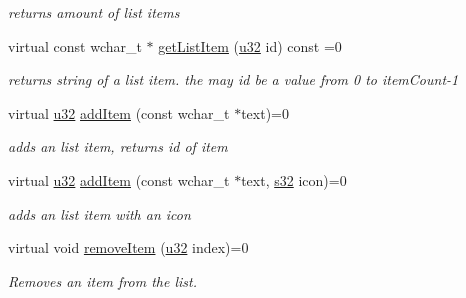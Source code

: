 \begin{DoxyCompactItemize}
\begin{DoxyCompactList}\small\item\em returns amount of list items \end{DoxyCompactList}\item 
\mbox{\label{classirr_1_1gui_1_1IGUIListBox_af68ea08c93b0959ea464146bc1f4d82f}} 
virtual const wchar\+\_\+t $\ast$ \hyperlink{classirr_1_1gui_1_1IGUIListBox_af68ea08c93b0959ea464146bc1f4d82f}{get\+List\+Item} (\hyperlink{namespaceirr_a0416a53257075833e7002efd0a18e804}{u32} id) const =0
\begin{DoxyCompactList}\small\item\em returns string of a list item. the may id be a value from 0 to item\+Count-\/1 \end{DoxyCompactList}\item 
\mbox{\label{classirr_1_1gui_1_1IGUIListBox_a298dbba8da28248b563a906c520dc3be}} 
virtual \hyperlink{namespaceirr_a0416a53257075833e7002efd0a18e804}{u32} \hyperlink{classirr_1_1gui_1_1IGUIListBox_a298dbba8da28248b563a906c520dc3be}{add\+Item} (const wchar\+\_\+t $\ast$text)=0
\begin{DoxyCompactList}\small\item\em adds an list item, returns id of item \end{DoxyCompactList}\item 
virtual \hyperlink{namespaceirr_a0416a53257075833e7002efd0a18e804}{u32} \hyperlink{classirr_1_1gui_1_1IGUIListBox_a2cfc2ff5f8f5114a92bd3618e79327e0}{add\+Item} (const wchar\+\_\+t $\ast$text, \hyperlink{namespaceirr_ac66849b7a6ed16e30ebede579f9b47c6}{s32} icon)=0
\begin{DoxyCompactList}\small\item\em adds an list item with an icon \end{DoxyCompactList}\item 
\mbox{\label{classirr_1_1gui_1_1IGUIListBox_a6c19c6db0bcf52756d9bb866063a770b}} 
virtual void \hyperlink{classirr_1_1gui_1_1IGUIListBox_a6c19c6db0bcf52756d9bb866063a770b}{remove\+Item} (\hyperlink{namespaceirr_a0416a53257075833e7002efd0a18e804}{u32} index)=0
\begin{DoxyCompactList}\small\item\em Removes an item from the list. \end{DoxyCompactList}\item 

\end{DoxyCompactItemize}
